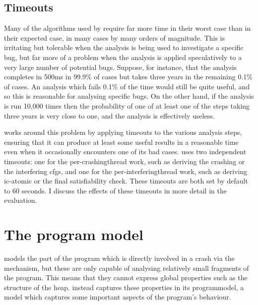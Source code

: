 \subsection{Timeouts}

Many of the algorithms used by {\technique} require far more time in
their worst case than in their expected case, in many cases by many
orders of magnitude.  This is irritating but tolerable when the
analysis is being used to investigate a specific bug, but far more of
a problem when the analysis is applied speculatively to a very large
number of potential bugs.  Suppose, for instance, that the analysis
completes in 500ms in 99.9\% of cases but takes three years in the
remaining 0.1\% of cases.  An analysis which fails 0.1\% of the time
would still be quite useful, and so this is reasonable for analysing
specific bugs.  On the other hand, if the analysis is run 10,000 times
then the probability of one of at least one of the steps taking three
years is very close to one, and the analysis is effectively useless.

{\Technique} works around this problem by applying timeouts to the
various analysis steps, ensuring that it can produce at least some
useful results in a reasonable time even when it occasionally
encounters one of its bad cases.  {\Implementation} uses two
independent timeouts: one for the per-\gls{crashingthread} work, such
as deriving the crashing {\StateMachine} or the interfering
\glspl{cfg}, and one for the per-\gls{interferingthread} work, such as
deriving \gls{ic-atomic} or the final satisfiability check.  These
timeouts are both set by default to 60 seconds.  I discuss the effects
of these timeouts in more detail in the evaluation.

\section{The program model}
\label{sect:program_model}


{\Technique} models the part of the program which is directly involved
in a crash via the {\StateMachine} mechanism, but these are only
capable of analysing relatively small fragments of the program.  This
means that they cannot express global properties such as the structure
of the heap.  {\Technique} instead captures these properties in its
\gls{programmodel}, a model which captures some important aspects of
the program's behaviour.


